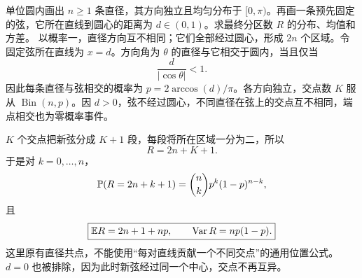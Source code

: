单位圆内画出 $n\ge1$ 条直径，其方向独立且均匀分布于 $[0,\pi)$。再画一条预先固定的弦，它所在直线到圆心的距离为 $d\in(0,1)$。求最终分区数 $R$ 的分布、均值和方差。
\solution 以概率一，直径方向互不相同；它们全部经过圆心，形成 $2n$ 个区域。令固定弦所在直线为 $x=d$。方向角为 $\theta$ 的直径与它相交于圆内，当且仅当
\[
\frac d{|\cos\theta|}<1.
\]
因此每条直径与弦相交的概率为 $p=2\arccos(d)/\pi$。各方向独立，交点数 $K$ 服从 $\operatorname{Bin}(n,p)$。因 $d>0$，弦不经过圆心，不同直径在弦上的交点互不相同，端点相交也为零概率事件。

$K$ 个交点把新弦分成 $K+1$ 段，每段将所在区域一分为二，所以
\[
\boxed{R=2n+K+1.}
\]
于是对 $k=0,\ldots,n$，
\[
\mathbb{P}(R=2n+k+1)=\binom nkp^k(1-p)^{n-k},
\]
且
\[
\boxed{\mathbb{E} R=2n+1+np,\qquad \operatorname{Var} R=np(1-p).}
\]
\pitfall 这里原有直径共点，不能使用“每对直线贡献一个不同交点”的通用位置公式。$d=0$ 也被排除，因为此时新弦经过同一个中心，交点不再互异。
